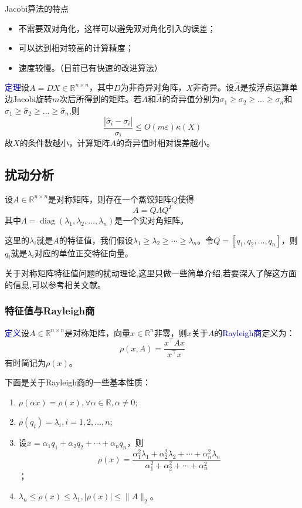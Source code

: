 \documentclass[12pt,a4paper]{article}
\begin{document}
Jacobi算法的特点
\begin{itemize}
	\item 不需要双对角化，这样可以避免双对角化引入的误差；
	\item 可以达到相对较高的计算精度；
	\item 速度较慢。（目前已有快速的改进算法）
\end{itemize}

\textcolor{blue}{定理}\quad 设$A=DX\in \mathbb {R}^{n\times n}$，其中$D$为非奇异对角阵，$X$非奇异。设$\hat {A}$是按浮点运算单边Jacobi旋转$m$次后所得到的矩阵。若$A$和$\hat {A}$的奇异值分别为$\sigma_{1} \geq \sigma_{2} \geq \ldots \geq \sigma_{n}$和$\hat{\sigma}_{1} \geq \hat{\sigma}_{2} \geq \ldots \geq \hat{\sigma}_{n}$,则$$
\frac{\left|\hat{\sigma}_{i}-\sigma_{i}\right|}{\sigma_{i}} \leq O(m \varepsilon) \kappa(X)
$$
故$X$的条件数越小，计算矩阵$A$的奇异值时相对误差越小。
\subsection{扰动分析}
设$A\in \mathbb{R}^{n\times n}$是对称矩阵，则存在一个蒸饺矩阵$Q$使得$$A=Q\Lambda Q^T$$
其中$\Lambda=\operatorname{diag}\left(\lambda_{1}, \lambda_{2}, \dots, \lambda_{n}\right)$是一个实对角矩阵。

这里的$\lambda_{i}$就是$A$的特征值，我们假设$\lambda_{1} \geq \lambda_{2} \geq \cdots \geq \lambda_{n}$。令$Q=\left[q_{1}, q_{2}, \ldots, q_{n}\right]$，则$q_i$就是$\lambda_{i}$对应的单位正交特征向量。

关于对称矩阵特征值问题的扰动理论,这里只做一些简单介绍,若要深入了解这方面的信息,可以参考相关文献。
\subsubsection{特征值与Rayleigh商}
\textcolor{blue}{定义}\quad 设$A\in \mathbb{R}^{n\times n}$是对称矩阵，向量$x\in \mathbb{R}^n$非零，则$x$关于$A$的\textcolor{blue}{Rayleigh商}定义为：$$
\rho(x, A)=\frac{x^{\top} A x}{x^{\top} x}
$$
有时简记为$\rho(x)$。

下面是关于Rayleigh商的一些基本性质：
\begin{enumerate}[(1)]
	\item $\rho(\alpha x)=\rho(x), \forall \alpha \in \mathbb{R}, \alpha \neq 0$;
	\item $\rho\left(q_{i}\right)=\lambda_{i}, i=1,2, \dots, n$;
	\item 设$x=\alpha_{1} q_{1}+\alpha_{2} q_{2}+\cdots+\alpha_{n} q_{n}$，则$$
	\rho(x)=\frac{\alpha_{1}^{2} \lambda_{1}+\alpha_{2}^{2} \lambda_{2}+\cdots+\alpha_{n}^{2} \lambda_{n}}{\alpha_{1}^{2}+\alpha_{2}^{2}+\cdots+\alpha_{n}^{2}}
	$$；
	\item $\lambda_{n} \leq \rho(x) \leq \lambda_{1},|\rho(x)| \leq\|A\|_{2}$。
\end{enumerate}
\end{document}
